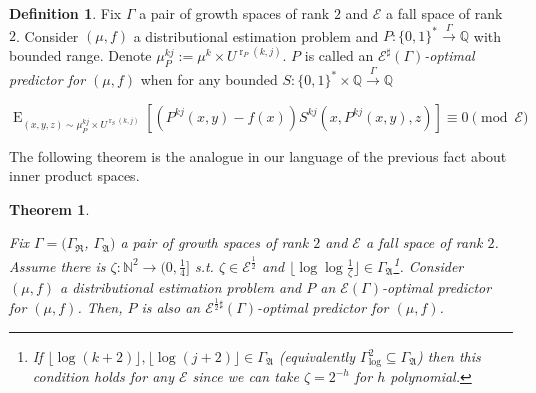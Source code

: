 \documentclass{article}
\numberwithin{equation}{section}
\theoremstyle{definition}
\newtheorem{definition}{Definition}[section]
\theoremstyle{plain}
\newtheorem{theorem}{Theorem}[section]
\newcommand{\Words}{{\{ 0, 1 \}^*}}
\DeclareMathOperator{\E}{E}
\DeclareMathOperator{\R}{r}
\newcommand{\Nats}{\mathbb{N}}
\newcommand{\Rats}{\mathbb{Q}}
\newcommand{\Floor}[1]{\lfloor #1 \rfloor}
\newcommand{\GrowR}{\Gamma_{\mathfrak{R}}}
\newcommand{\GrowA}{\Gamma_{\mathfrak{A}}}
\newcommand{\Fall}{\mathcal{E}}
\newcommand{\Scheme}{\xrightarrow{\Gamma}}
\begin{document}
\begin {definition}

Fix $\Gamma$ a pair of growth spaces of rank $2$ and $\Fall$ a fall space of rank $2$. Consider $(\mu,f)$ a distributional estimation problem and $P: \Words \Scheme \Rats$ with bounded range. Denote $\mu_P^{kj}:=\mu^k \times U^{\R_P(k,j)}$. $P$ is called an \emph{$\Fall^\sharp(\Gamma)$-optimal predictor for $(\mu,f)$} when for any bounded $S: \Words \times \Rats \Scheme \Rats$

\begin{equation}
\label{eqmin:op_sharp}
\E_{(x,y,z) \sim \mu_P^{kj} \times U^{\R_S(k,j)}}[(P^{kj}(x,y) - f(x))S^{kj}(x,P^{kj}(x,y),z)] \equiv 0 \pmod \Fall
\end{equation}

\end {definition}

The following theorem is the analogue in our language of the previous fact about inner product spaces.

\begin{theorem}
\label{thm:ort}

Fix $\Gamma=(\GrowR$, $\GrowA)$ a pair of growth spaces of rank $2$ and $\Fall$ a fall space of rank $2$. Assume there is $\zeta: \Nats^2 \rightarrow (0,\frac{1}{4}]$ s.t. $\zeta \in \Fall^{\frac{1}{2}}$ and ${\Floor{\log \log \frac{1}{\zeta}} \in \GrowA}$\footnote{If $\Floor{\log(k+2)}, \Floor{\log(j+2)} \in \GrowA$ (equivalently $\Gamma_{\text{log}}^2 \subseteq \GrowA$) then this condition holds for any $\Fall$ since we can take $\zeta = 2^{-h}$ for $h$ polynomial.}. Consider $(\mu,f)$ a distributional estimation problem and $P$ an $\Fall(\Gamma)$-optimal predictor for $(\mu,f)$. Then, $P$ is also an $\Fall^{\frac{1}{2}\sharp}(\Gamma)$-optimal predictor for $(\mu,f)$.

\end{theorem}
\end{document}
